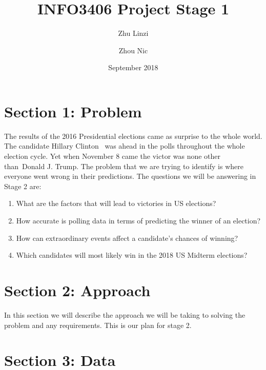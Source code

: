 \documentclass[12pt,a4paper]{article}
\begin{document}
\begin{titlepage}
    \title{INFO3406 Project Stage 1}
    \author{Zhu Linzi\\
            \and
            Zhou Nic
    }
    \date{September 2018}
    \maketitle
\end{titlepage}

    \pagebreak
    \tableofcontents
    \pagebreak

    \section{Section 1: Problem}
    The results of the 2016 Presidential elections came as surprise to the whole world. The candidate Hillary Clinton \
    was ahead in the polls throughout the whole election cycle. Yet when November 8 came the victor was none other than\
    Donald J. Trump. The problem that we are trying to identify is where everyone went wrong in their predictions.
    \newline \newline
    The questions we will be answering in Stage 2 are:

    \begin{enumerate}
        \item What are the factors that will lead to victories in US elections?
        \item How accurate is polling data in terms of predicting the winner of an election?
        \item How can extraordinary events affect a candidate's chances of winning?
        \item Which candidates will most likely win in the 2018 US Midterm elections?
    \end{enumerate}

    \section{Section 2: Approach}
    In this section we will describe the approach we will be taking to solving the problem and any requirements. This is our plan for stage 2.

    \section{Section 3: Data}
\end{document}

